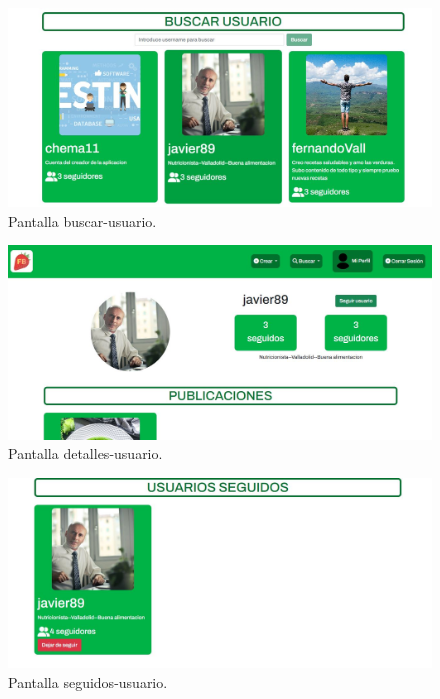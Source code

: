 \begin{figure}
  \centering
  \includegraphics[scale=0.30]{img/ma-buscar-usuario.JPG}
  \caption{Pantalla buscar-usuario.}
  \label{fig:ma-buscar-usuario}
\end{figure}


\begin{figure}
  \centering
  \includegraphics[scale=0.30]{img/ma-detalles-usuario.JPG}
  \caption{Pantalla detalles-usuario.}
  \label{fig:ma-detalles-usuario}
\end{figure}

\begin{figure}
  \centering
  \includegraphics[scale=0.30]{img/ma-seguidos-usuario.JPG}
  \caption{Pantalla seguidos-usuario.}
  \label{fig:ma-seguidos-usuario}
\end{figure}

